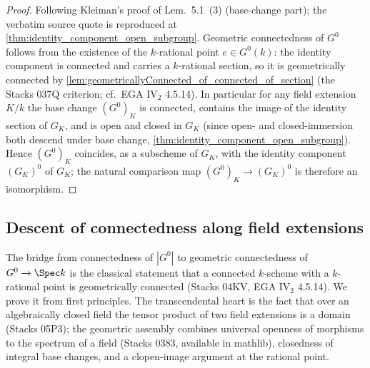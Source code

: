 \begin{proof}
  \leanok
  Following Kleiman's proof of Lem.~5.1~(3) (base-change part); the
  verbatim source quote is reproduced at
  \cref{thm:identity_component_open_subgroup}.
  Geometric connectedness of \(G^0\) follows from the existence of the
  \(k\)-rational point \(e \in G^0(k)\): the identity component is
  connected and carries a \(k\)-rational section, so it is geometrically
  connected by
  \cref{lem:geometricallyConnected_of_connected_of_section} (the
  Stacks 037Q criterion; cf.\ EGA IV\(_2\) 4.5.14). In particular for
  any field extension \(K/k\) the base change \((G^0)_K\) is connected,
  contains the image of the identity section of \(G_K\), and is open and
  closed in \(G_K\) (since open- and closed-immersion both descend under
  base change, \cref{thm:identity_component_open_subgroup}). Hence
  \((G^0)_K\) coincides, as a subscheme of \(G_K\), with the identity
  component \((G_K)^0\) of \(G_K\); the natural comparison map
  \((G^0)_K \to (G_K)^0\) is therefore an isomorphism.
\end{proof}

\subsection{Descent of connectedness along field extensions}
\label{subsec:connectedness_descent}

The bridge from connectedness of \(|G^0|\) to geometric connectedness of
\(G^0 \to \Spec k\) is the classical statement that a connected
\(k\)-scheme with a \(k\)-rational point is geometrically connected
(Stacks 04KV, EGA IV\(_2\) 4.5.14). We prove it from first principles.
The transcendental heart is the fact that over an algebraically closed
field the tensor product of two field extensions is a domain
(Stacks 05P3); the geometric assembly combines universal openness of
morphisms to the spectrum of a field (Stacks 0383, available in
mathlib), closedness of integral base changes, and a clopen-image
argument at the rational point.

